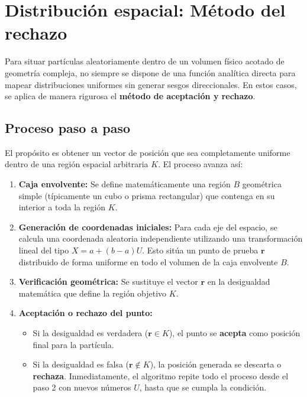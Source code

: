 \documentclass[11pt]{article}
\begin{document}
\section{Distribución espacial: Método del rechazo}

Para situar partículas aleatoriamente dentro de un volumen físico acotado de geometría compleja, no siempre se dispone de una función analítica directa para mapear distribuciones uniformes sin generar sesgos direccionales. En estos casos, se aplica de manera rigurosa el \textbf{método de aceptación y rechazo}.

\subsection{Proceso paso a paso}

El propósito es obtener un vector de posición que sea completamente uniforme dentro de una región espacial arbitraria $K$. El proceso avanza así:

\begin{enumerate}
  \item \textbf{Caja envolvente:} Se define matemáticamente una región $B$ geométrica simple (típicamente un cubo o prisma rectangular) que contenga en su interior a toda la región $K$.
  \item \textbf{Generación de coordenadas iniciales:} Para cada eje del espacio, se calcula una coordenada aleatoria independiente utilizando una transformación lineal del tipo $X = a + (b-a)U$. Esto sitúa un punto de prueba $\mathbf{r}$ distribuido de forma uniforme en todo el volumen de la caja envolvente $B$.
  \item \textbf{Verificación geométrica:} Se sustituye el vector $\mathbf{r}$ en la desigualdad matemática que define la región objetivo $K$.
  \item \textbf{Aceptación o rechazo del punto:} 
  \begin{itemize}
      \item Si la desigualdad es verdadera ($\mathbf{r} \in K$), el punto se \textbf{acepta} como posición final para la partícula.
      \item Si la desigualdad es falsa ($\mathbf{r} \notin K$), la posición generada se descarta o \textbf{rechaza}. Inmediatamente, el algoritmo repite todo el proceso desde el paso 2 con nuevos números $U$, hasta que se cumpla la condición.
  \end{itemize}
\end{enumerate}
\end{document}
